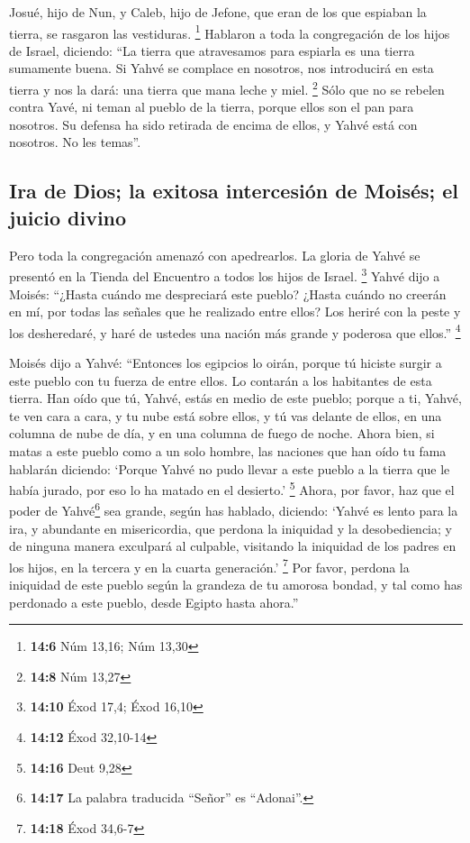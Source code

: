 \begin{paracol}{2}
 Josué, hijo de Nun, y Caleb, hijo de Jefone, que eran de
los que espiaban la tierra, se rasgaron las vestiduras. \footnote{\textbf{14:6}
  Núm 13,16; Núm 13,30}  Hablaron a toda la congregación
de los hijos de Israel, diciendo: ``La tierra que atravesamos para
espiarla es una tierra sumamente buena.  Si Yahvé se
complace en nosotros, nos introducirá en esta tierra y nos la dará: una
tierra que mana leche y miel. \footnote{\textbf{14:8} Núm 13,27}
 Sólo que no se rebelen contra Yavé, ni teman al pueblo de
la tierra, porque ellos son el pan para nosotros. Su defensa ha sido
retirada de encima de ellos, y Yahvé está con nosotros. No les temas''.

\hypertarget{ira-de-dios-la-exitosa-intercesiuxf3n-de-moisuxe9s-el-juicio-divino}{%
\subsection{Ira de Dios; la exitosa intercesión de Moisés; el juicio
divino}\label{ira-de-dios-la-exitosa-intercesiuxf3n-de-moisuxe9s-el-juicio-divino}}

 Pero toda la congregación amenazó con apedrearlos. La
gloria de Yahvé se presentó en la Tienda del Encuentro a todos los hijos
de Israel. \footnote{\textbf{14:10} Éxod 17,4; Éxod 16,10}
 Yahvé dijo a Moisés: ``¿Hasta cuándo me despreciará este
pueblo? ¿Hasta cuándo no creerán en mí, por todas las señales que he
realizado entre ellos?  Los heriré con la peste y los
desheredaré, y haré de ustedes una nación más grande y poderosa que
ellos.'' \footnote{\textbf{14:12} Éxod 32,10-14}

 Moisés dijo a Yahvé: ``Entonces los egipcios lo oirán,
porque tú hiciste surgir a este pueblo con tu fuerza de entre ellos.
 Lo contarán a los habitantes de esta tierra. Han oído
que tú, Yahvé, estás en medio de este pueblo; porque a ti, Yahvé, te ven
cara a cara, y tu nube está sobre ellos, y tú vas delante de ellos, en
una columna de nube de día, y en una columna de fuego de noche.
 Ahora bien, si matas a este pueblo como a un solo
hombre, las naciones que han oído tu fama hablarán diciendo:
 `Porque Yahvé no pudo llevar a este pueblo a la tierra
que le había jurado, por eso lo ha matado en el desierto.' \footnote{\textbf{14:16}
  Deut 9,28}  Ahora, por favor, haz que el poder de
Yahvé\footnote{\textbf{14:17} La palabra traducida ``Señor'' es
  ``Adonai''.} sea grande, según has hablado, diciendo: 
`Yahvé es lento para la ira, y abundante en misericordia, que perdona la
iniquidad y la desobediencia; y de ninguna manera exculpará al culpable,
visitando la iniquidad de los padres en los hijos, en la tercera y en la
cuarta generación.' \footnote{\textbf{14:18} Éxod 34,6-7}
 Por favor, perdona la iniquidad de este pueblo según la
grandeza de tu amorosa bondad, y tal como has perdonado a este pueblo,
desde Egipto hasta ahora.''


\end{paracol}
